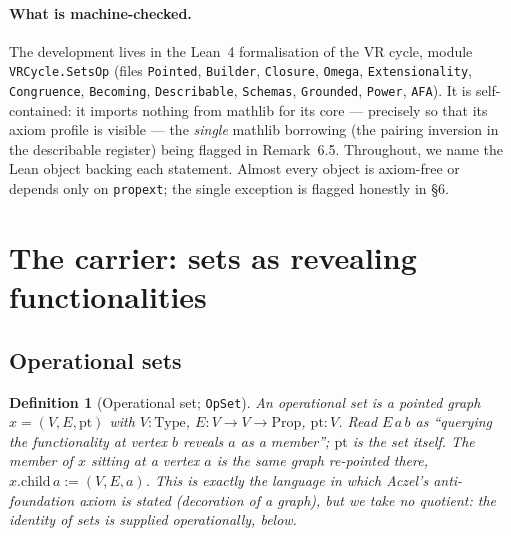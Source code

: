 \documentclass[11pt]{article}
\newtheorem{defn}[thm]{Definition}
\theoremstyle{remark}
\begin{document}
\paragraph{What is machine-checked.} The development lives in the Lean~4 formalisation of the VR
cycle, module \texttt{VRCycle.SetsOp} (files \texttt{Pointed}, \texttt{Builder}, \texttt{Closure},
\texttt{Omega}, \texttt{Extensionality}, \texttt{Congruence}, \texttt{Becoming},
\texttt{Describable}, \texttt{Schemas}, \texttt{Grounded}, \texttt{Power}, \texttt{AFA}). It is self-contained: it imports
nothing from mathlib for its core --- precisely so that its axiom profile is visible --- the
\emph{single} mathlib borrowing (the pairing inversion in the describable register) being flagged
in Remark~6.5. Throughout, we name the Lean object backing each statement. Almost every object is
axiom-free or depends only on \texttt{propext}; the single exception is flagged honestly in \S6.

\section{The carrier: sets as revealing functionalities}

\subsection{Operational sets}
\begin{defn}[Operational set; \texttt{OpSet}]
An operational set is a pointed graph $x=(V,E,\mathrm{pt})$ with $V:\mathrm{Type}$,
$E:V\to V\to\mathrm{Prop}$, $\mathrm{pt}:V$. Read $E\,a\,b$ as ``querying the functionality at
vertex $b$ reveals $a$ as a member''; $\mathrm{pt}$ is the set itself. The member of $x$ sitting at
a vertex $a$ is the same graph re-pointed there, $x.\mathrm{child}\,a:=(V,E,a)$. This is exactly the
language in which Aczel's anti-foundation axiom is stated (decoration of a graph), but we take
\emph{no quotient}: the identity of sets is supplied operationally, below.
\end{defn}
\end{document}
